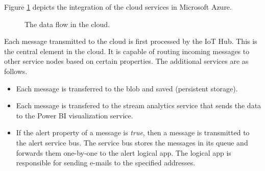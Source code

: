 \documentclass[a4paper, 11pt]{article}
\begin{document}
	Figure \ref{fig:cloud} depicts the integration of the cloud services in Microsoft Azure.
		
	\begin{figure}[h!]
		\center
		\caption{The data flow in the cloud.}
		\label{fig:cloud}
	\end{figure}
	
	Each message transmitted to the cloud is first processed by the IoT Hub. This is the central element in the cloud. It is 		capable of routing incoming messages to other service nodes based on certain properties. The additional services are as follows.
	 \begin{itemize}
	 	\item Each message is transferred to the blob and saved (persistent storage).
		\item Each message is transfered to the stream analytics service that sends the data to the Power BI visualization service.
	 	\item If the alert property of a message is \textsl{true}, then a message is transmitted to the alert service bus. The service bus stores the messages in its queue and forwards them one-by-one to the alert logical app. The logical app is responsible for sending e-mails to the specified addresses.
	 \end{itemize}
	
\end{document}

